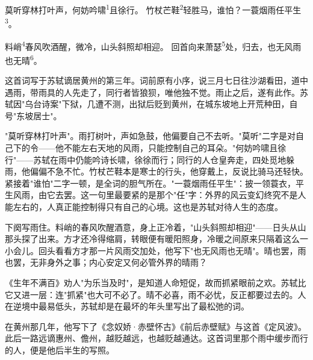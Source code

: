 
\begin{poem}
莫听穿林打叶声，何妨吟啸\textsuperscript{1}且徐行。
竹杖芒鞋\textsuperscript{2}轻胜马，谁怕？一蓑烟雨任平生\textsuperscript{3}。

料峭\textsuperscript{4}春风吹酒醒，微冷，山头斜照却相迎。
回首向来萧瑟\textsuperscript{5}处，归去，也无风雨也无晴\textsuperscript{6}。
\end{poem}

\begin{annotations}
\end{annotations}

\begin{appreciation}
这首词写于苏轼谪居黄州的第三年。词前原有小序，说三月七日往沙湖看田，道中遇雨，带雨具的人先走了，同行者皆狼狈，唯他独不觉。雨止之后，遂有此作。苏轼因"乌台诗案"下狱，几遭不测，出狱后贬到黄州，在城东坡地上开荒种田，自号"东坡居士"。

"莫听穿林打叶声"。雨打树叶，声如急鼓，他偏要自己不去听。"莫听"二字是对自己下的令——他不能左右天地的风雨，只能控制自己的耳朵。"何妨吟啸且徐行"——苏轼在雨中仍能吟诗长啸，徐徐而行；同行的人仓皇奔走，四处觅地躲雨，他偏偏不急不忙。竹杖芒鞋本是寒士的行头，他穿戴上，反说比骑马还轻快。紧接着"谁怕"二字一顿，是全词的胆气所在。"一蓑烟雨任平生"：披一领蓑衣，平生风雨，由它去罢。这一句里最要紧的是那个"任"字：外界的风云变幻终究不是人能左右的，人真正能控制得只有自己的心境。这也是苏轼对待人生的态度。

下阕写雨住。料峭的春风吹醒酒意，身上正冷着，"山头斜照却相迎"——日头从山那头探了出来。方才还冷得缩肩，转眼便有暖阳照身，冷暖之间原来只隔着这么一小会儿。回头看看方才那一片风雨交加处，他写下"也无风雨也无晴"。晴也罢，雨也罢，无非身外之事；内心安定又何必管外界的晴雨？

《生年不满百》劝人"为乐当及时"，是知道人命短促，故而抓紧眼前之欢。苏轼比它又进一层：连"抓紧"也大可不必了。晴不必喜，雨不必忧，反正都要过去的。人在逆境中最易低头，苏轼却是在最坏的年头里写出了最松弛的词。

在黄州那几年，他写下了《念奴娇·赤壁怀古》《前后赤壁赋》与这首《定风波》。此后一路远谪惠州、儋州，越贬越远，也越贬越通达。这首词里那个雨中缓步而行的人，便是他后半生的写照。
\end{appreciation}
